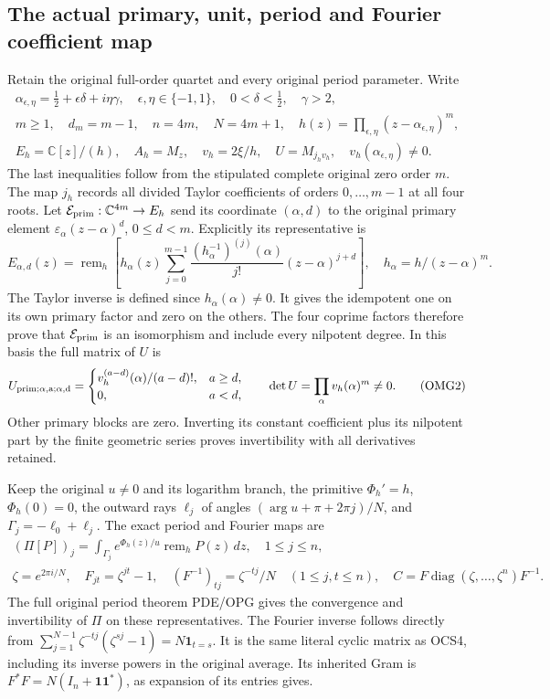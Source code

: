 \documentclass[11pt,a4paper]{article}
\begin{document}
\subsection{The actual primary, unit, period and Fourier coefficient map}
Retain the original full-order quartet and every original period
parameter. Write
\[
\begin{gathered}
 \alpha_{\epsilon,\eta}=\tfrac12+\epsilon\delta+i\eta\gamma,
 \quad\epsilon,\eta\in\{-1,1\},\quad0<\delta<\tfrac12,\quad\gamma>2,\\
 m\ge1,\quad d_m=m-1,\quad n=4m,\quad N=4m+1,\quad
 h(z)=\prod_{\epsilon,\eta}(z-\alpha_{\epsilon,\eta})^m,\\
 E_h=\mathbb C[z]/(h),\quad A_h=M_z,\quad
 v_h=2\xi/h,\quad U=M_{j_hv_h},\quad v_h(\alpha_{\epsilon,\eta})\ne0.
\end{gathered}\tag{OMG1}
\]
The last inequalities follow from the stipulated complete original
zero order $m$. The map $j_h$ records all divided Taylor coefficients
of orders $0,\ldots,m-1$ at all four roots. Let
$\mathcal E_{\rm prim}:\mathbb C^{4m}\to E_h$ send its coordinate
$(\alpha,d)$ to the original primary element $\varepsilon_\alpha
(z-\alpha)^d$, $0\le d<m$. Explicitly its representative is
\[
 E_{\alpha,d}(z)=\operatorname{rem}_h\left[
 h_\alpha(z)\sum_{j=0}^{m-1}
       \frac{(h_\alpha^{-1})^{(j)}(\alpha)}{j!}(z-\alpha)^{j+d}
                                      \right],\quad
 h_\alpha=h/(z-\alpha)^m.
\]
The Taylor inverse is defined since $h_\alpha(\alpha)\ne0$.
It gives the idempotent one on its own primary factor and zero
on the others. The four coprime factors therefore prove that
$\mathcal E_{\rm prim}$ is an isomorphism and include every
nilpotent degree. In this basis the full matrix of $U$ is
\[
 U_{\rm prim;\alpha,a;\alpha,d}
 =\begin{cases}v_h^{(a-d)}(\alpha)/(a-d)!,&a\ge d,\\0,&a<d,
   \end{cases}\qquad
 \det U=\prod_\alpha v_h(\alpha)^m\ne0.
 \tag{OMG2}
\]
Other primary blocks are zero. Inverting its constant coefficient
plus its nilpotent part by the finite geometric series proves
invertibility with all derivatives retained.

Keep the original $u\ne0$ and its logarithm branch, the primitive
$\Phi_h'=h$, $\Phi_h(0)=0$, the outward rays $\ell_j$ of angles
$(\arg u+\pi+2\pi j)/N$, and $\Gamma_j=-\ell_0+\ell_j$.
The exact period and Fourier maps are
\[
\begin{gathered}
 (\Pi[P])_j=\int_{\Gamma_j}e^{\Phi_h(z)/u}
                     \operatorname{rem}_hP(z)\,dz,\quad1\le j\le n,\\
 \zeta=e^{2\pi i/N},\quad F_{jt}=\zeta^{jt}-1,\quad
 (F^{-1})_{tj}=\zeta^{-tj}/N\quad(1\le j,t\le n),\quad
 C=F\operatorname{diag}(\zeta,\ldots,\zeta^n)F^{-1}.
\end{gathered}\tag{OMG3}
\]
The full original period theorem PDE/OPG gives the convergence and
invertibility of $\Pi$ on these representatives. The Fourier inverse
follows directly from
$\sum_{j=1}^{N-1}\zeta^{-tj}(\zeta^{sj}-1)=N\mathbf1_{t=s}$.
It is the same literal cyclic matrix as OCS4, including its inverse
powers in the original average. Its inherited Gram is
$F^*F=N(I_n+\mathbf1\mathbf1^*)$, as expansion of its entries gives.
\end{document}
